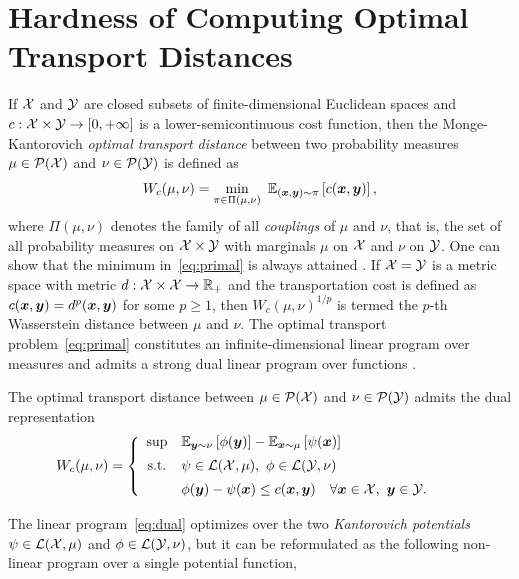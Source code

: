 \documentclass[11pt, a4paper, oneside, reqno]{article}
\begin{document}
	\section{Hardness of Computing Optimal Transport Distances}
	\label{sec:complexity}
	If $\mathcal{X}$ and $\mathcal{Y}$ are closed subsets of finite-dimensional Euclidean spaces and $c: \mathcal{X} \times \mathcal{Y} \to [0,+\infty]$ is a lower-semicontinuous cost function, then the Monge-Kantorovich {\em optimal transport distance} between two probability measures $\mu\in\mathcal P(\mathcal{X})$ and $\nu\in\mathcal P(\mathcal{Y})$ is defined as
	\begin{equation}
	W_c(\mu, \nu) = \min\limits_{\pi \in \Pi(\mu,\nu)} ~ \mathbb{E}_{(\boldsymbol x, \boldsymbol y) \sim \pi}\left[{c(\boldsymbol x, \boldsymbol y)}\right],
	\label{eq:primal}
	\end{equation}
	where $\Pi(\mu,\nu)$ denotes the family of all  {\em couplings} of $\mu$ and $\nu$, that is, the set of all probability measures on $\mathcal{X} \times \mathcal{Y}$ with marginals $\mu$ on $\mathcal{X}$ and $\nu$ on $\mathcal{Y}$. One can show that the minimum in~\eqref{eq:primal} is always attained \citep[Theorem~4.1]{villani}. If $\mathcal{X}=\mathcal{Y}$ is a metric space with metric $d:\mathcal{X}\times \mathcal{X}\rightarrow \mathbb{R}_+$ and the transportation cost is defined as $c(\boldsymbol x, \boldsymbol y)=d^p(\boldsymbol x,\boldsymbol y)$ for some $p \geq 1$, then $W_c(\mu, \nu)^{1/p}$ is termed the $p$-th Wasserstein distance between $\mu$ and $\nu$. The optimal transport problem~\eqref{eq:primal} constitutes an infinite-dimensional linear program over measures and admits a strong dual linear program over functions \citep[Theorem~5.9]{villani}.
	\begin{proposition}
		\label{prop:kantorovich}
		The optimal transport distance between $\mu \in \mathcal{P}(\mathcal{X})$ and $\nu \in \mathcal{P}(\mathcal{Y})$ admits the dual representation
		\begin{equation}
		\label{eq:dual}
		W_c(\mu, \nu) =\left\{ \begin{array}{c@{\quad}l@{\qquad}l}
		\sup & \DS \mathbb{E}_{\bs y \sim \nu}\left[ {\phi(\bs y)}\right] - \mathbb{E}_{\bs x \sim \mu}\left[{\psi(\bs x)}\right] & \\ [0.5em]
		\st & \psi \in \lx,~ \phi \in \ly & \\ [0.5em]
		& \phi(\bs y) - \psi(\bs x) \leq c(\bs x, \bs y) \quad \forall \bs x \in \x,~ \bs y \in \y.
		\end{array}\right.
		\end{equation}
	\end{proposition}
	The linear program~\eqref{eq:dual} optimizes over the two {\em Kantorovich potentials} $\psi \in \mathcal{L}(\mathcal{X}, \mu)$ and $\phi \in \mathcal{L}(\mathcal{Y}, \nu)$, but it can be reformulated as the following non-linear program over a single potential function,
\end{document}
